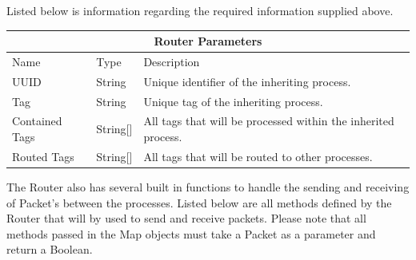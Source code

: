 \documentclass{article}
\begin{document}
Listed below is information regarding the required information supplied above.

\begin{center}
\begin{tabular}{ | p{3cm} || p{3cm} | p{9cm} | }
\hline
\multicolumn{3}{|c|}{Router Parameters}\\
\hline
Name & Type & Description\\
\hline
UUID & String & Unique identifier of the inheriting process.\\
\hline
Tag & String & Unique tag of the inheriting process.\\
\hline
Contained Tags & String[] & All tags that will be processed within the inherited process.\\
\hline
Routed Tags & String[] & All tags that will be routed to other processes.\\
\hline
\end{tabular}
\end{center}

The Router also has several built in functions to handle the sending and receiving of Packet's between the processes. Listed below are all methods defined by the Router that will by used to send and receive packets. Please note that all methods passed in the Map objects must take a Packet as a parameter and return a Boolean.
\end{document}
